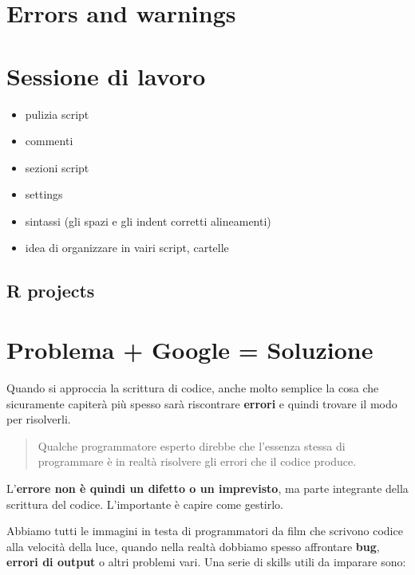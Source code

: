 \documentclass[
]{book}
\providecommand{\tightlist}{%
  \setlength{\itemsep}{0pt}\setlength{\parskip}{0pt}}
\begin{document}
\hypertarget{errors-and-warnings}{%
\section{Errors and warnings}\label{errors-and-warnings}}

\hypertarget{sessione-di-lavoro}{%
\section{Sessione di lavoro}\label{sessione-di-lavoro}}

\begin{itemize}
\tightlist
\item
  pulizia script
\item
  commenti
\item
  sezioni script
\item
  settings
\item
  sintassi (gli spazi e gli indent corretti alineamenti)
\item
  idea di organizzare in vairi script, cartelle
\end{itemize}

\hypertarget{r-projects}{%
\subsection{R projects}\label{r-projects}}

\hypertarget{problema-google-soluzione}{%
\section{Problema + Google = Soluzione}\label{problema-google-soluzione}}

Quando si approccia la scrittura di codice, anche molto semplice la cosa che sicuramente capiterà più spesso sarà riscontrare \textbf{errori} e quindi trovare il modo per risolverli.

\begin{quote}
Qualche programmatore esperto direbbe che l'essenza stessa di programmare è in realtà risolvere gli errori che il codice produce.
\end{quote}

L'\textbf{errore non è quindi un difetto o un imprevisto}, ma parte integrante della scrittura del codice. L'importante è capire come gestirlo.

Abbiamo tutti le immagini in testa di programmatori da film che scrivono codice alla velocità della luce, quando nella realtà dobbiamo spesso affrontare \textbf{bug}, \textbf{errori di output} o altri problemi vari. Una serie di skills utili da imparare sono:
\end{document}
